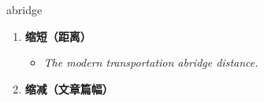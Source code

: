 
\begin{frame}
{\huge abridge}
\begin{center}
\begin{enumerate}\Large
  \item \textbf{缩短（距离）}
  \begin{itemize}
    \item \em{\Large{The modern transportation abridge distance.}}
  \end{itemize}
  \item \textbf{缩减（文章篇幅）}
\end{enumerate}
\end{center}
\end{frame}
